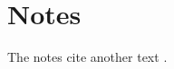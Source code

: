 \documentclass{article}
\begin{document}
\section{Notes}
The notes cite another text \cite{landau1976}.





\end{document}
